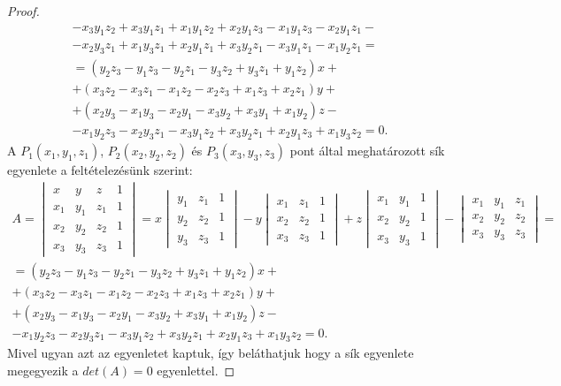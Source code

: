 \begin{proof}
\[\begin{array}{c}
		- x_3 y_1 z_2 + x_3 y_1 z_1 + x_1 y_1 z_2 + x_2 y_1 z_3 - x_1 y_1 z_3 - x_2 y_1 z_1 -\\
		- x_2 y_3 z_1 + x_1 y_3 z_1 + x_2 y_1 z_1 + x_3 y_2 z_1 - x_3 y_1 z_1 - x_1 y_2 z_1 =\\
		=(y_2 z_3 - y_1 z_3 - y_2 z_1 - y_3 z_2 + y_3 z_1 + y_1 z_2)x+\\
		+(x_3 z_2 - x_3 z_1 - x_1 z_2 - x_2 z_3 + x_1 z_3 + x_2 z_1)y+\\
		+(x_2 y_3 - x_1 y_3 - x_2 y_1 - x_3 y_2 + x_3 y_1 + x_1 y_2)z-\\
		- x_1 y_2 z_3 - x_2 y_3 z_1 - x_3 y_1 z_2 + x_3 y_2 z_1 + x_2 y_1 z_3  + x_1 y_3 z_2 = 0.
	\end{array}
	\]
	A $P_1(x_1, y_1, z_1)$, $P_2(x_2, y_2, z_2)$ és $P_3(x_3, y_3, z_3)$ pont által meghatározott sík egyenlete a feltételezésünk szerint:
	\[
	\begin{array}{c}
		A =
		\begin{vmatrix}
			x & y & z & 1 \\
			x_1 & y_1 & z_1 & 1 \\
			x_2 & y_2 & z_2 & 1 \\
			x_3 & y_3 & z_3 & 1
		\end{vmatrix}
		= x
		\begin{vmatrix}
			y_1 & z_1 & 1 \\
			y_2 & z_2 & 1 \\
			y_3 & z_3 & 1
		\end{vmatrix}
		- y
		\begin{vmatrix}
			x_1 & z_1 & 1 \\
			x_2 & z_2 & 1 \\
			x_3 & z_3 & 1
		\end{vmatrix}
		+ z
		\begin{vmatrix}
			x_1 & y_1 & 1 \\
			x_2 & y_2 & 1 \\
			x_3 & y_3 & 1
		\end{vmatrix}
		-
		\begin{vmatrix}
			x_1 & y_1 & z_1 \\
			x_2 & y_2 & z_2 \\
			x_3 & y_3 & z_3
		\end{vmatrix}
		=\\
		=(y_2 z_3 - y_1 z_3 - y_2 z_1 - y_3 z_2 + y_3 z_1 + y_1 z_2)x+\\
		+(x_3 z_2 - x_3 z_1 - x_1 z_2 - x_2 z_3 + x_1 z_3 + x_2 z_1)y+\\
		+(x_2 y_3 - x_1 y_3 - x_2 y_1 - x_3 y_2 + x_3 y_1 + x_1 y_2)z-\\
		- x_1 y_2 z_3 - x_2 y_3 z_1 - x_3 y_1 z_2 + x_3 y_2 z_1 + x_2 y_1 z_3  + x_1 y_3 z_2 = 0.
	\end{array}
	\]
	Mivel ugyan azt az egyenletet kaptuk, így beláthatjuk hogy a sík egyenlete megegyezik a $det(A)=0$ egyenlettel.
\end{proof}

